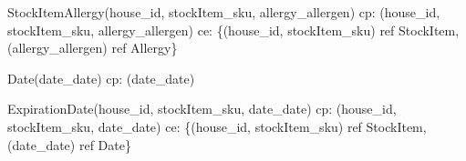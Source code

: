 {\begin{description}
		\item StockItemAllergy(house\_id, stockItem\_sku, allergy\_allergen) \newline
		\acrshort{cp}: (house\_id, stockItem\_sku, allergy\_allergen) \newline
		\acrshort{ce}: \{(house\_id, stockItem\_sku) ref StockItem, (allergy\_allergen) ref Allergy\}
	
		\item Date(date\_date) \newline
		\acrshort{cp}: (date\_date)
	
		\item ExpirationDate(house\_id, stockItem\_sku, date\_date) \newline
		\acrshort{cp}: (house\_id, stockItem\_sku, date\_date) \newline
		\acrshort{ce}: \{(house\_id, stockItem\_sku) ref StockItem, (date\_date) ref Date\}

	\end{description}	
}


